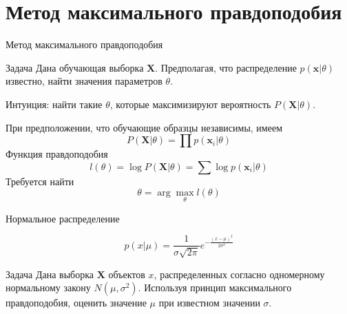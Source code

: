 \documentclass[10pt,a4paper]{beamer}
\begin{document}

\section{Метод максимального правдоподобия}


\begin{frame}{Метод максимального правдоподобия}

\begin{block}{Задача}
Дана обучающая выборка $\mathbf{X}$. Предполагая, что распределение $p(\mathbf{x} | \theta)$ известно, найти значения параметров $\theta$.
\end{block}

\vspace{1em}
Интуиция: найти такие $\theta$, которые максимизируют вероятность $P(\mathbf{X}|\theta)$.

\vspace{1em}
При предположении, что обучающие образцы независимы, имеем	
\[
P(\mathbf{X} | \theta) = \prod p(\mathbf{x}_i | \theta)
\]
Функция правдоподобия
\[
l(\theta) = \log{P(\mathbf{X} | \theta)} = \sum \log p(\mathbf{x}_i | \theta)
\]
Требуется найти
\[
\theta = \arg \max_\theta l(\theta)
\]

\end{frame}


\begin{frame}{Нормальное распределение}

\[
p(x | \mu) = \frac{1}{\sigma \sqrt{2 \pi}} e^{-\frac{(x-\mu)^2}{2\sigma^2}}
\]

\begin{exampleblock}{Задача}
Дана выборка $\mathbf{X}$ объектов $x$, распределенных согласно одномерному нормальному закону $N(\mu, \sigma^2)$. Используя принцип максимального правдоподобия, оценить значение $\mu$ при известном значении $\sigma$.
\end{exampleblock}

\end{frame}

\end{document}
